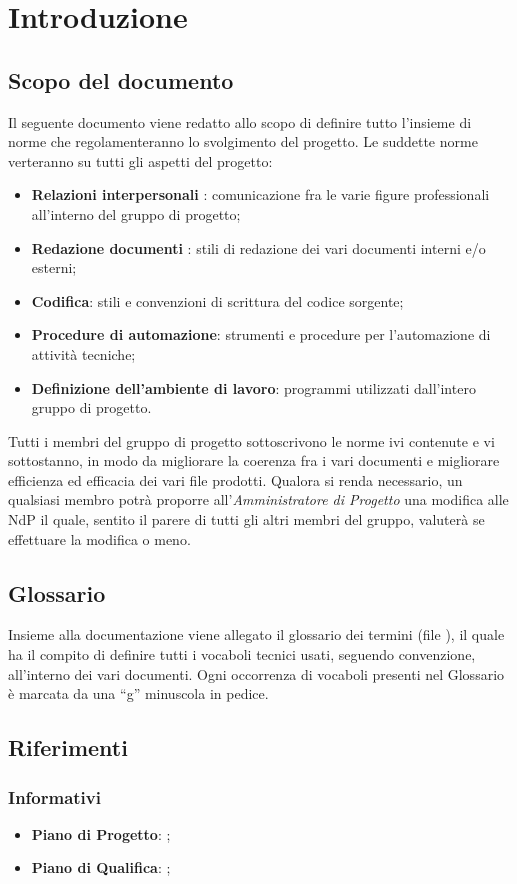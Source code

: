\section{Introduzione}{
	\subsection{Scopo del documento}{
		Il seguente documento viene redatto allo scopo di definire tutto l’insieme di norme che regolamenteranno lo svolgimento del progetto. Le suddette norme verteranno su tutti gli aspetti del progetto:
		\begin{itemize}
        \item \textbf{Relazioni interpersonali} : comunicazione fra le varie figure professionali
		all’interno del gruppo di progetto;
		\item \textbf{Redazione documenti} : stili di redazione dei vari documenti interni e/o
		esterni;
		\item \textbf{Codifica}: stili e convenzioni di scrittura del codice sorgente;
		\item \textbf{Procedure di automazione}: strumenti e procedure per l’automazione
		di attività tecniche;
		\item \textbf{Definizione dell’ambiente di lavoro}: programmi utilizzati dall’intero
		gruppo di progetto.
		\end{itemize}
		Tutti i membri del gruppo di progetto sottoscrivono le norme ivi contenute e vi	sottostanno, in modo da migliorare la coerenza fra i vari documenti e migliorare efficienza ed efficacia dei vari file prodotti.
		Qualora si renda necessario, un qualsiasi membro potrà proporre all’\emph{Amministratore di Progetto} una modifica alle NdP il quale, sentito il parere di tutti gli altri membri del gruppo, valuterà se effettuare la modifica o meno.
		
	 }
	\subsection{Glossario}{ 
	Insieme alla documentazione viene allegato il glossario dei termini (file \href{run:../../Esterni/\fGlossario}{\fEscapeGlossario}), il quale ha il compito di definire tutti i vocaboli tecnici usati, seguendo convenzione, all’interno dei vari documenti.  Ogni occorrenza di vocaboli presenti nel Glossario è marcata da una “g” minuscola in pedice.	
	}
}
   \subsection{Riferimenti}
     \subsubsection{Informativi}
     \begin{itemize}
       \item \textbf{Piano di Progetto}: \href{run:../../Interni/\fPianoDiProgetto}{\fEscapePianoDiProgetto};
       \item \textbf{Piano di Qualifica}:  \href{run:../../Esterni/\fPianoDiQualifica}{\fEscapePianoDiQualifica};
     \end{itemize}
        